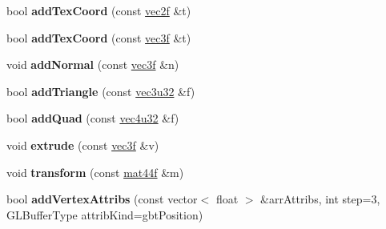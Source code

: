 \begin{DoxyCompactItemize}
\item 
\hypertarget{classps_1_1scene_1_1Geometry_a64ec7b280cd43ebecd94a9282e9ec875}{}bool {\bfseries add\+Tex\+Coord} (const \hyperlink{classps_1_1base_1_1Vec2}{vec2f} \&t)\label{classps_1_1scene_1_1Geometry_a64ec7b280cd43ebecd94a9282e9ec875}

\item 
\hypertarget{classps_1_1scene_1_1Geometry_a3573bc0a577cfde0d0af21e2ed2a3de1}{}bool {\bfseries add\+Tex\+Coord} (const \hyperlink{classps_1_1base_1_1Vec3}{vec3f} \&t)\label{classps_1_1scene_1_1Geometry_a3573bc0a577cfde0d0af21e2ed2a3de1}

\item 
\hypertarget{classps_1_1scene_1_1Geometry_a247bd8f84d43b77bf180ba093991ee3d}{}void {\bfseries add\+Normal} (const \hyperlink{classps_1_1base_1_1Vec3}{vec3f} \&n)\label{classps_1_1scene_1_1Geometry_a247bd8f84d43b77bf180ba093991ee3d}

\item 
\hypertarget{classps_1_1scene_1_1Geometry_a537a223546ac2ef6839453c1a143d49f}{}bool {\bfseries add\+Triangle} (const \hyperlink{classps_1_1base_1_1Vec3}{vec3u32} \&f)\label{classps_1_1scene_1_1Geometry_a537a223546ac2ef6839453c1a143d49f}

\item 
\hypertarget{classps_1_1scene_1_1Geometry_ac1e4ff204129c151ef34c17ea81d320e}{}bool {\bfseries add\+Quad} (const \hyperlink{classps_1_1base_1_1Vec4}{vec4u32} \&f)\label{classps_1_1scene_1_1Geometry_ac1e4ff204129c151ef34c17ea81d320e}

\item 
\hypertarget{classps_1_1scene_1_1Geometry_a5b2efd93099a82f875a2397e72efb1ba}{}void {\bfseries extrude} (const \hyperlink{classps_1_1base_1_1Vec3}{vec3f} \&v)\label{classps_1_1scene_1_1Geometry_a5b2efd93099a82f875a2397e72efb1ba}

\item 
\hypertarget{classps_1_1scene_1_1Geometry_ac1440ef0e4aec89e9a106803a8d2c8ce}{}void {\bfseries transform} (const \hyperlink{classps_1_1base_1_1Matrix}{mat44f} \&m)\label{classps_1_1scene_1_1Geometry_ac1440ef0e4aec89e9a106803a8d2c8ce}

\item 
\hypertarget{classps_1_1scene_1_1Geometry_a4a5837a775c3c462968aa1246b1d3dd4}{}bool {\bfseries add\+Vertex\+Attribs} (const vector$<$ float $>$ \&arr\+Attribs, int step=3, G\+L\+Buffer\+Type attrib\+Kind=gbt\+Position)\label{classps_1_1scene_1_1Geometry_a4a5837a775c3c462968aa1246b1d3dd4}


\end{DoxyCompactItemize}
